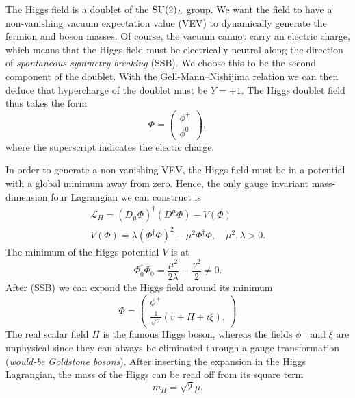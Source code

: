 The Higgs field is a doublet of the $\mathrm{SU}(2)_L$ group. We want the field to have a non-vanishing vacuum expectation value (\acs{VEV}) to dynamically generate the fermion and boson masses. Of course, the vacuum cannot carry an electric charge, which means that the Higgs field must be electrically neutral along the direction of \textit{spontaneous symmetry breaking} (\acs{SSB}). We choose this to be the second component of the doublet. With the Gell-Mann--Nishijima relation we can then deduce that hypercharge of the doublet must be $Y = +1$. The Higgs doublet field thus takes the form
\begin{equation}
\Phi = \begin{pmatrix}
  \phi^+ \\
  \phi^0
\end{pmatrix},
\end{equation}
where the superscript indicates the electic charge.

In order to generate a non-vanishing \acs{VEV}, the Higgs field must be in a potential with a global minimum away from zero. Hence, the only gauge invariant mass-dimension four Lagrangian we can construct is
\begin{equation}
\begin{gathered}
\mathcal{L}_H = \left( D_\mu \Phi \right)^\dagger \left( D^\mu \Phi \right) - V(\Phi) \\
V(\Phi) = \lambda (\Phi^\dagger \Phi )^2 - \mu^2 \Phi^\dagger \Phi, \quad \mu^2, \lambda > 0.
\end{gathered}
\end{equation}
The minimum of the Higgs potential $V$ is at
\begin{equation}
\Phi_0^\dagger \Phi_0 = \frac{\mu^2}{2 \lambda} \equiv \frac{v^2}{2} \neq 0.
\end{equation}
After (\acs{SSB}) we can expand the Higgs field around its minimum
\begin{equation}
\Phi = \begin{pmatrix}
  \phi^+ \\
  \frac{1}{\sqrt{2}} ( v + H + i \xi ).
\end{pmatrix}
\end{equation}
The real scalar field $H$ is the famous Higgs boson, whereas the fields $\phi^\pm$ and $\xi$ are unphysical since they can always be eliminated through a gauge transformation (\textit{would-be Goldstone bosons}). After inserting the expansion in the Higgs Lagrangian, the mass of the Higgs can be read off from its square term
\begin{equation}
m_H = \sqrt{2} \mu.
\end{equation}

